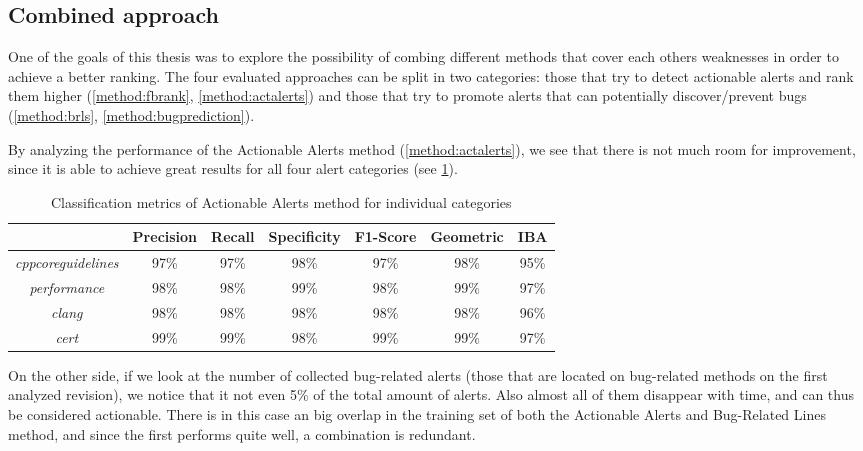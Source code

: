 \subsection{Combined approach}
\label{results:ensemble_approach}
One of the goals of this thesis was to explore the possibility of combing different methods that cover each others weaknesses in order to achieve a better ranking. The four evaluated approaches can be split in two categories: those that try to detect actionable alerts and rank them higher (\cref{method:fbrank}, \cref{method:actalerts}) and those that try to promote alerts that can potentially discover/prevent bugs (\cref{method:brls}, \cref{method:bugprediction}).

By analyzing the performance of the Actionable Alerts method (\cref{method:actalerts}), we see that there is not much room for improvement, since it is able to achieve great results for all four alert categories (see \cref{results:individual_categories}).

\begin{table}[H]
	\centering
	\caption{Classification metrics of Actionable Alerts method for individual categories}
	\label{results:individual_categories}
	\begin{tabular}{@{}ccccccc@{}}
		\toprule
		& \textbf{Precision} & \textbf{Recall} & \textbf{Specificity} & \textbf{F1-Score} & \textbf{Geometric} & \textbf{IBA} \\ \midrule
		\textit{cppcoreguidelines} & 97\%               & 97\%            & 98\%                 & 97\%              & 98\%               & 95\%         \\
		\textit{performance}       & 98\%               & 98\%            & 99\%                 & 98\%              & 99\%               & 97\%         \\
		\textit{clang}             & 98\%               & 98\%            & 98\%                 & 98\%              & 98\%               & 96\%         \\
		\textit{cert}              & 99\%               & 99\%            & 98\%                 & 99\%              & 99\%               & 97\%         \\ \bottomrule
	\end{tabular}
\end{table}


On the other side, if we look at the number of collected bug-related alerts (those that are located on bug-related methods on the first analyzed revision), we notice that it not even 5\% of the total amount of alerts. Also almost all of them disappear with time, and can thus be considered actionable. There is in this case an big overlap in the training set of both the Actionable Alerts and Bug-Related Lines method, and since the first performs quite well, a combination is redundant. 

